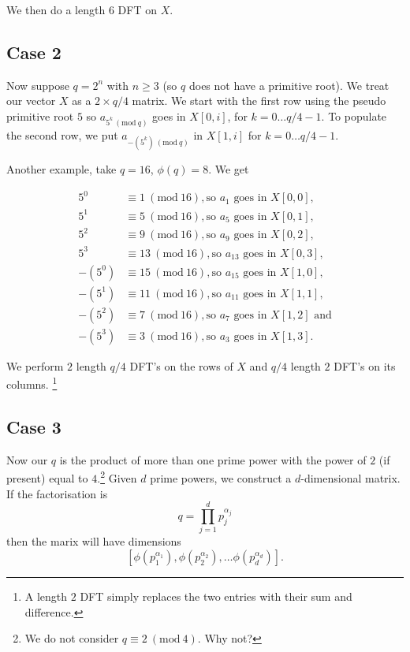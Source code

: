 \documentclass[12pt]{amsart}
\newcommand{\Mod}[1]{\ (\mathrm{mod}\ #1)}
\theoremstyle{remark}
\numberwithin{theorem}{section}
\numberwithin{equation}{section}
\begin{document}
We then do a length $6$ DFT on $X$.

\subsection{Case 2}

Now suppose $q=2^n$ with $n\geq 3$ (so $q$ does not have a primitive root). We treat our vector $X$ as a $2\times q/4$ matrix. We start with the first row using the pseudo primitive root $5$ so $a_{5^k\Mod {q}}$ goes in $X[0,i]$, for $k=0\ldots q/4-1$. To populate the second row, we put $a_{-(5^k)\Mod{q}}$ in $X[1,i]$ for $k=0\ldots q/4-1$.

Another example, take $q=16$, $\phi(q)=8$. We get

\begin{equation}\label{eq:ex16}
  \begin{split}
    5^0 &\equiv 1\Mod{16}, \textrm{so }a_1\textrm{ goes in } X[0,0],\\
    5^1 &\equiv 5\Mod{16}, \textrm{so }a_5\textrm{ goes in } X[0,1],\\
    5^2 &\equiv 9\Mod{16}, \textrm{so }a_9\textrm{ goes in } X[0,2],\\
    5^3 &\equiv 13\Mod{16}, \textrm{so }a_{13}\textrm{ goes in } X[0,3],\\
    -(5^0) &\equiv 15\Mod{16}, \textrm{so }a_{15}\textrm{ goes in } X[1,0],\\
    -(5^1) &\equiv 11\Mod{16}, \textrm{so } a_{11}\textrm{ goes in } X[1,1],\\
    -(5^2) &\equiv 7\Mod{16}, \textrm{so } a_7\textrm{ goes in } X[1,2] \textrm{ and}\\
    -(5^3) &\equiv 3\Mod{16}, \textrm{so } a_3\textrm{ goes in } X[1,3].
  \end{split}
\end{equation}

We perform $2$ length $q/4$ DFT's on the rows of $X$ and $q/4$ length $2$ DFT's on its columns. \footnote{A length $2$ DFT simply replaces the two entries with their sum and difference.}

\subsection{Case 3}

Now our $q$ is the product of more than one prime power with the power of $2$ (if present) equal to $4$.\footnote{We do not consider $q\equiv 2\Mod{4}$. Why not?} Given $d$ prime powers, we construct a $d$-dimensional matrix.  If the factorisation is
$$
q=\prod_{j=1}^d p_j^{\alpha_j}
$$
then the marix will have dimensions
$$
[\phi(p_1^{\alpha_1}),\phi(p_2^{\alpha_2}),\ldots\phi(p_d^{\alpha_d})].
$$
\end{document}
